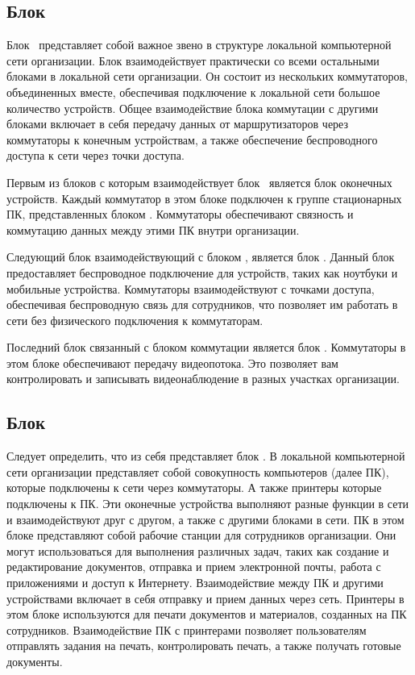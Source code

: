 \subsection{Блок \blockSwith}   

Блок \blockSwith\ представляет собой важное звено в структуре локальной компьютерной сети организации. 
Блок взаимодействует практически со всеми остальными блоками в локальной сети организации. 
Он состоит из нескольких коммутаторов, объединенных вместе, обеспечивая подключение к локальной сети большое количество устройств.
Общее взаимодействие блока коммутации с другими блоками включает в себя передачу данных от маршрутизаторов через коммутаторы к конечным 
устройствам, а также обеспечение беспроводного доступа к сети через точки доступа. 

Первым из блоков с которым взаимодействует блок \blockSwith\ является блок оконечных устройств. 
Каждый коммутатор в этом блоке подключен к группе стационарных ПК, представленных блоком \blockDevices\@. 
Коммутаторы обеспечивают связность и коммутацию данных между этими ПК внутри организации.

Следующий блок взаимодействующий с блоком \blockSwith\@, является блок \blockAccessPoint\@. 
Данный блок предоставляет беспроводное подключение для устройств, таких как ноутбуки и мобильные устройства. 
Коммутаторы взаимодействуют с точками доступа, обеспечивая беспроводную связь для сотрудников,
что позволяет им работать в сети без физического подключения к коммутаторам.

Последний блок связанный с блоком коммутации является блок \blockVideo\@. 
Коммутаторы в этом блоке обеспечивают передачу видеопотока. 
Это позволяет вам контролировать и записывать видеонаблюдение в разных участках организации.

\subsection{Блок \blockDevices}   

Следует определить, что из себя представляет блок \blockDevices\@. 
В локальной компьютерной сети организации представляет собой совокупность компьютеров (далее ПК), 
которые подключены к сети через коммутаторы. А также принтеры которые подключены к ПК.
Эти оконечные устройства выполняют разные функции в сети и взаимодействуют друг с другом, а также с другими блоками в сети. 
ПК в этом блоке представляют собой рабочие станции для сотрудников организации. Они могут использоваться для выполнения различных задач, 
таких как создание и редактирование документов, отправка и прием электронной почты, работа с приложениями и доступ к Интернету.
Взаимодействие между ПК и другими устройствами включает в себя отправку и прием данных через сеть.
Принтеры в этом блоке используются для печати документов и материалов, созданных на ПК сотрудников. 
Взаимодействие ПК с принтерами позволяет пользователям отправлять задания на печать, контролировать печать, а также получать готовые документы.

